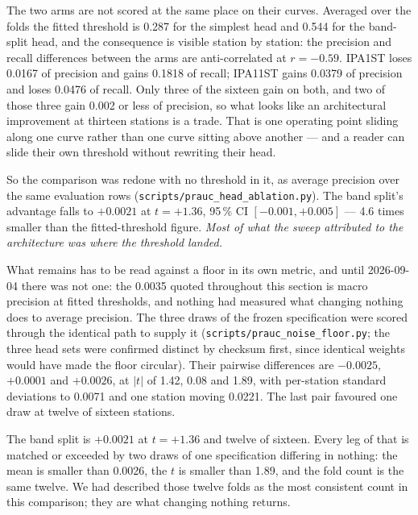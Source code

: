 \documentclass[review,3p,times]{elsarticle}
\begin{document}
The two arms are not scored at the same place on their curves. Averaged over the
folds the fitted threshold is 0.287 for the simplest head and 0.544 for the
band-split head, and the consequence is visible station by station: the
precision and recall differences between the arms are anti-correlated at
$r = -0.59$. IPA1ST loses 0.0167 of precision and gains 0.1818 of recall;
IPA11ST gains 0.0379 of precision and loses 0.0476 of recall. Only three of the
sixteen gain on both, and two of those three gain 0.002 or less of precision, so
what looks like an architectural improvement at thirteen stations is a trade.
That is one operating point sliding along one curve rather than one curve
sitting above another --- and a reader can slide their own threshold without
rewriting their head.

So the comparison was redone with no threshold in it, as average precision over
the same evaluation rows (\texttt{scripts/prauc\_head\_ablation.py}). The band
split's advantage falls to $+0.0021$ at $t = +1.36$, 95\,\% CI
$[-0.001, +0.005]$ --- 4.6 times smaller than the fitted-threshold figure.
\emph{Most of what the sweep attributed to the architecture was where the
threshold landed.}

What remains has to be read against a floor in its own metric, and until
2026-09-04 there was not one: the 0.0035 quoted throughout this section is
macro precision at fitted thresholds, and nothing had measured what changing
nothing does to average precision. The three draws of the frozen specification
were scored through the identical path to supply it
(\texttt{scripts/prauc\_noise\_floor.py}; the three head sets were confirmed
distinct by checksum first, since identical weights would have made the floor
circular). Their pairwise differences are $-0.0025$, $+0.0001$ and $+0.0026$,
at $|t|$ of 1.42, 0.08 and 1.89, with per-station standard deviations to 0.0071
and one station moving 0.0221. The last pair favoured one draw at twelve of
sixteen stations.

The band split is $+0.0021$ at $t = +1.36$ and twelve of sixteen. Every leg of
that is matched or exceeded by two draws of one specification differing in
nothing: the mean is smaller than 0.0026, the $t$ is smaller than 1.89, and the
fold count is the same twelve. We had described those twelve folds as the most
consistent count in this comparison; they are what changing nothing returns.
\end{document}
